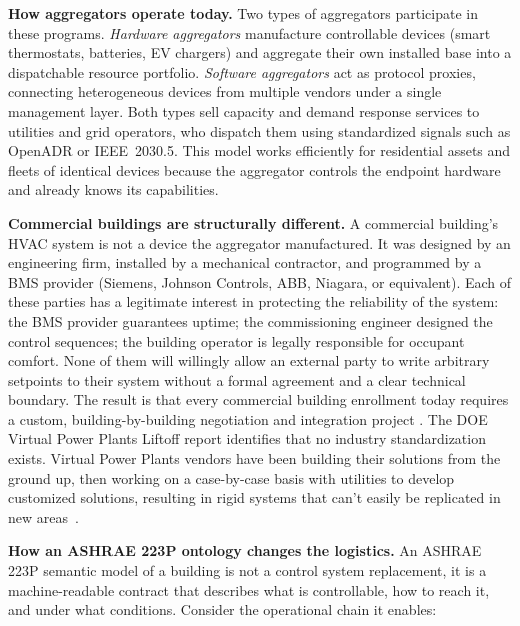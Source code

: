 \textbf{How aggregators operate today.}
Two types of aggregators participate in these programs.
\emph{Hardware aggregators} manufacture controllable devices (smart thermostats, batteries, EV
chargers) and aggregate their own installed base into a dispatchable resource portfolio.
\emph{Software aggregators} act as protocol proxies, connecting heterogeneous devices from
multiple vendors under a single management layer.
Both types sell capacity and demand response services to utilities and grid operators, who dispatch
them using standardized signals such as OpenADR or IEEE~2030.5.
This model works efficiently for residential assets and fleets of identical devices because the
aggregator controls the endpoint hardware and already knows its capabilities.

\textbf{Commercial buildings are structurally different.}
A commercial building's HVAC system is not a device the aggregator manufactured.
It was designed by an engineering firm, installed by a mechanical contractor, and programmed by a
BMS provider (Siemens, Johnson Controls, ABB, Niagara, or equivalent).
Each of these parties has a legitimate interest in protecting the reliability of the system: the BMS
provider guarantees uptime; the commissioning engineer designed the control sequences; the building
operator is legally responsible for occupant comfort.
None of them will willingly allow an external party to write arbitrary setpoints to their system
without a formal agreement and a clear technical boundary.
The result is that every commercial building enrollment today requires a custom, building-by-building
negotiation and integration project \cite{DOE_VPP2025}.
The DOE Virtual Power Plants Liftoff report identifies that no industry standardization
exists. Virtual Power Plants vendors have been building their solutions from the ground up, then
working on a case-by-case basis with utilities to develop customized solutions, resulting in rigid
systems that can't easily be replicated in new areas~\cite{DOE_VPP2025}.

\textbf{How an ASHRAE 223P ontology changes the logistics.}
An ASHRAE 223P semantic model of a building is not a control system replacement, it is a
machine-readable contract that describes what is controllable, how to reach it, and under what
conditions.
Consider the operational chain it enables:

